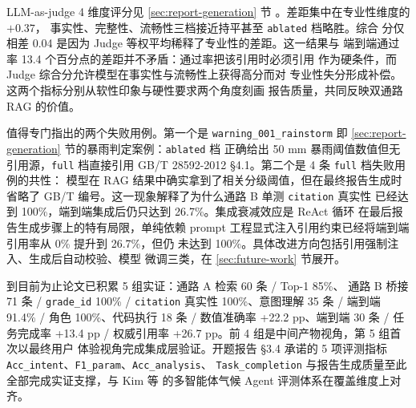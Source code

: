 LLM-as-judge 4 维度评分见 \ref{sec:report-generation} 节
。差距集中在专业性维度的 $+0.37$，
事实性、完整性、流畅性三档接近持平甚至 \texttt{ablated} 档略胜。综合
分仅相差 0.04 是因为 Judge 等权平均稀释了专业性的差距。这一结果与
端到端通过率 13.4 个百分点的差距并不矛盾：通过率把该引用时必须引用
作为硬条件，而 Judge 综合分允许模型在事实性与流畅性上获得高分而对
专业性失分形成补偿。这两个指标分别从软性印象与硬性要求两个角度刻画
报告质量，共同反映双通路 RAG 的价值。

值得专门指出的两个失败用例。第一个是 \texttt{warning\_\bk{}001\_\bk{}rainstorm}
即 \ref{sec:report-generation} 节的暴雨判定案例：\texttt{ablated} 档
正确给出 50 mm 暴雨阈值数值但无引用源，\texttt{full} 档直接引用
GB/T 28592-2012 §4.1。第二个是 4 条 \texttt{full} 档失败用例的共性：
模型在 RAG 结果中确实拿到了相关分级阈值，但在最终报告生成时省略了
GB/T 编号。这一现象解释了为什么通路 B 单测 \texttt{citation} 真实性
已经达到 100\%，端到端集成后仍只达到 26.7\%。集成衰减效应是 ReAct
循环 \cite{ref18} 在最后报告生成步骤上的特有局限，单纯依赖 prompt
工程显式注入引用约束已经将端到端引用率从 0\% 提升到 26.7\%，但仍
未达到 100\%。具体改进方向包括引用强制注入、生成后自动校验、模型
微调三类，在 \ref{sec:future-work} 节展开。

到目前为止论文已积累 5 组实证：通路 A 检索 60 条 / Top-1 85\%、
通路 B 桥接 71 条 / \texttt{grade\_\bk{}id} 100\% / \texttt{citation}
真实性 100\%、意图理解 35 条 / 端到端 91.4\% / 角色 100\%、代码执行
18 条 / 数值准确率 +22.2 pp、端到端 30 条 / 任务完成率 +13.4 pp /
权威引用率 +26.7 pp。前 4 组是中间产物视角，第 5 组首次以最终用户
体验视角完成集成层验证。开题报告 §3.4 承诺的 5 项评测指标
\texttt{Acc\_\bk{}intent}、\texttt{F1\_\bk{}param}、\texttt{Acc\_\bk{}analysis}、
\texttt{Task\_\bk{}completion} 与报告生成质量至此全部完成实证支撑，与
Kim 等 \cite{ref1} 的多智能体气候 Agent 评测体系在覆盖维度上对齐。

